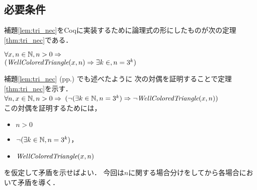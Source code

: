 
\subsection{必要条件} \label{sec:nec}
補題\ref{lem:tri_nec}をCoqに実装するために論理式の形にしたものが次の定理\ref{thm:tri_nec}である．
\begin{thm}[必要条件] \label{thm:tri_nec}
  $\forall x, n \in \mathbb{N}, n > 0 \Rightarrow$ \\
  $(\textit{WellColoredTriangle}(x,n) \Rightarrow \exists k \in , n = 3^k)$ 
\end{thm}
補題\ref{lem:tri_nec} (pp.\pageref{lem:tri_nec}) でも述べたように
次の対偶を証明することで定理\ref{thm:tri_nec}を示す．\\
$\forall n, x \in \mathbb{N}, n > 0 \Rightarrow$
$(\lnot(\exists k \in \mathbb{N}, n = 3 ^ k) \Rightarrow \lnot\textit{WellColoredTriangle}(x,n))$ \\
この対偶を証明するためには，
\begin{itemize}
\item
  $n > 0$
\item
  $\lnot(\exists k \in \mathbb{N}, n = 3 ^ k)$，
\item
  $\textit{WellColoredTriangle}(x,n)$
\end{itemize}
を仮定して矛盾を示せばよい．
今回は$n$に関する場合分けをしてから各場合において矛盾を導く．
